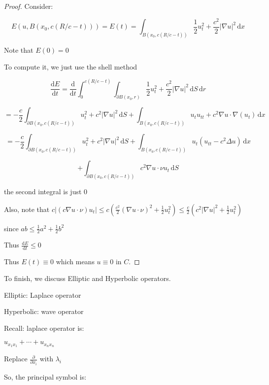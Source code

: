 \documentclass{article}
\theoremstyle{definition}
\begin{document}
\begin{proof}
    Consider:

    \[
        E(u,B(x_0, c(R / c - t))) = E(t) = \int_{B(x_0,c(R / c - t))}^{} \frac{1}{2} u_t^2 + \frac{c^2}{2} \vert \nabla u \vert ^2 \,\mathrm{d}x 
    \]

    Note that \(E(0)=0\) 

    To compute it, we just use the shell method

    \[
        \frac{\mathrm{d}E}{\mathrm{d}t} = \frac{\mathrm{d}}{\mathrm{d}t} \int_{0}^{c(R / c - t)} \int_{\partial B(x_0,r)}^{} \frac{1}{2} u_t^2 + \frac{c^2}{2} \vert \nabla u \vert ^2 \,\mathrm{d}S  \,\mathrm{d}r 
    \]

    \[
        = -\frac{c}{2} \int_{\partial B(x_0, c(R / c - t))}^{} u_t^2 + c^2\vert \nabla u \vert ^2 \,\mathrm{d}S + \int_{B(x_0, c(R / c - t))}^{} u_t u_{t t} + c^2 \nabla u\cdot\nabla(u_t) \,\mathrm{d}x 
    \]

    \[
        =-\frac{c}{2} \int_{\partial B(x_0, c(R / c - t))}^{} u_t^2 + c^2\vert \nabla u \vert ^2 \,\mathrm{d}S + \int_{B(x_0,c(R / c - t))}^{} u_t(u_{t t} - c^2 \Delta u) \,\mathrm{d}x 
    \]

    \[
        + \int_{\partial B(x_0, c(R / c - t))}^{} c^2 \nabla u\cdot\nu u_t \,\mathrm{d}S 
    \]

    the second integral is just \(0\) 
    
    Also, note that \(c\vert (c\nabla u\cdot\nu)u_t \vert \leq c(\frac{c^2}{2}(\nabla u\cdot\nu)^2 + \frac{1}{2} u_t^2) \leq \frac{c}{2}(c^2\vert \nabla u \vert ^2 +\frac{1}{2} u_t^2)\) 

    since \(ab \leq \frac{1}{2}a^2 + \frac{1}{2}b^2\) 

    Thus \(\frac{\mathrm{d}E}{\mathrm{d}t} \leq 0\) 

    Thus \(E(t) \equiv 0\) which means \(u\equiv 0\) in \(C\).  

\end{proof}

To finish, we discuss Elliptic and Hyperbolic operators.

Elliptic: Laplace operator

Hyperbolic: wave operator

Recall: laplace operator is:

\(u_{x_1 x_1} + \cdots + u_{x_n x_n}\)

Replace \(\frac{\partial}{\partial x_i}\) with \(\lambda_i\)

So, the principal symbol is:
\end{document}
